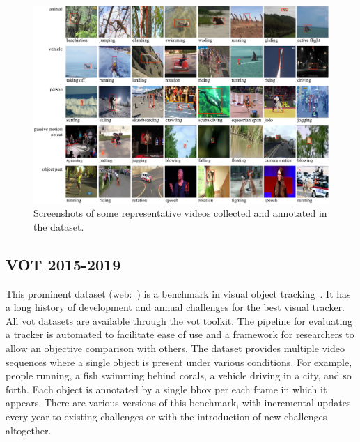 \begin{figure}[t]
    \centerline{\includegraphics[width=\linewidth]{figures/datasets/got10k_sample.pdf}}
    \caption[\gottenk{} dataset]{Screenshots of some representative videos collected and annotated in the \gottenk{} dataset. }
    \label{fig:GOT10kDataset}
\end{figure}

\subsection{VOT 2015-2019}
\label{ssec:VOTDataset}

This prominent dataset (web:~\cite{webvot2019dataset}) is a benchmark in visual object tracking~\cite{kristan2019motyolovot19}. It has a long history of development and annual challenges for the best visual tracker. All \gls{vot} datasets are available through the \gls{vot} toolkit. The pipeline for evaluating a tracker is automated to facilitate ease of use and a framework for researchers to allow an objective comparison with others. The dataset provides multiple video sequences where a single object is present under various conditions. For example, people running, a fish swimming behind corals, a vehicle driving in a city, and so forth. Each object is annotated by a single \gls{bbox} per each frame in which it appears. There are various versions of this benchmark, with incremental updates every year to existing challenges or with the introduction of new challenges altogether.

